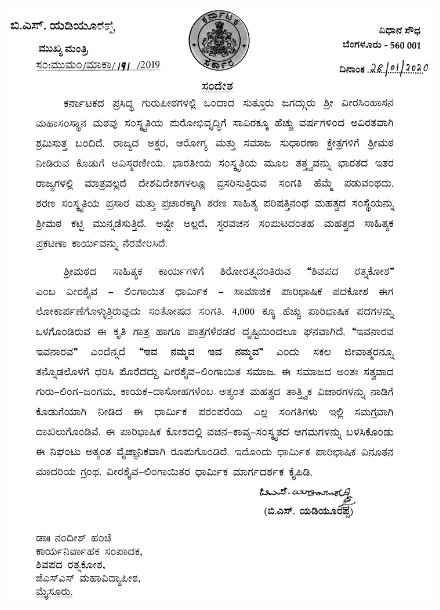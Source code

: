 \begin{figure}[H]
\centering
\includegraphics[scale=1.1]{images/003.eps}
\end{figure}

\newpage

\thispagestyle{empty}

